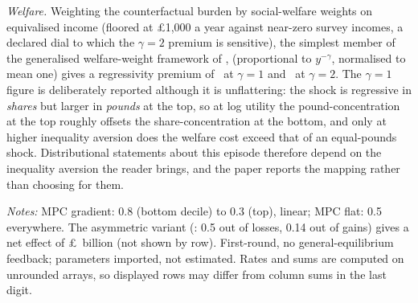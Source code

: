 \emph{Welfare.} Weighting the counterfactual burden by
\citet{atkinson1970} social-welfare weights on equivalised income
(floored at \pounds 1{,}000 a year against near-zero survey incomes,
a declared dial to which the $\gamma=2$ premium is sensitive),%
the simplest member of the generalised welfare-weight framework of
\citet{saezstantcheva2016}, (proportional to $y^{-\gamma}$, normalised to mean one) gives a
regressivity premium of \SsWelfPremiumGammaOne\ at $\gamma=1$ and
\SsWelfPremiumGammaTwo\ at $\gamma=2$. The $\gamma=1$ figure is
deliberately reported although it is unflattering: the shock is
regressive in \emph{shares} but larger in \emph{pounds} at the top, so at log
utility the pound-concentration at the top roughly offsets the
share-concentration at the bottom, and only at higher inequality
aversion does the welfare cost exceed that of an equal-pounds shock.
Distributional statements about this episode therefore depend on the
inequality aversion the reader brings, and the paper reports the
mapping rather than choosing for them.

\begin{table}[tbp]
\centering
\caption{First-round demand effects of the energy episode under
declared MPC scenarios}
\label{tab:mpc}
\small

\begin{minipage}{.85\textwidth}\footnotesize
\emph{Notes:} MPC gradient: 0.8 (bottom decile) to 0.3 (top),
linear; MPC flat: 0.5 everywhere. The asymmetric variant
(\citealp{bunn2018}: 0.5 out of losses, 0.14 out of gains) gives a
net effect of \pounds\SsMpcNetAsymBn\ billion (not shown by row).
First-round, no general-equilibrium feedback; parameters imported,
not estimated. Rates and sums are computed on unrounded arrays, so
displayed rows may differ from column sums in the last digit.
\end{minipage}
\end{table}
